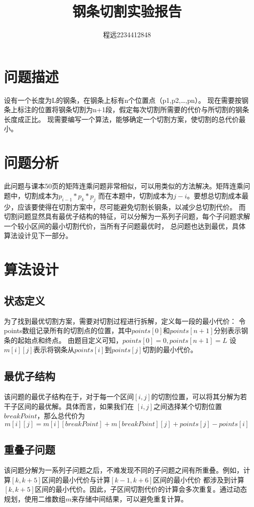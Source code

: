 \documentclass[UTF8]{ctexart}
\begin{document}
\title{\vspace{0cm}钢条切割实验报告}
\author{程远2234412848}
\date{}
\maketitle
\tableofcontents
\newpage

\section{问题描述}
设有一个长度为L的钢条，在钢条上标有n个位置点（p1,p2,…,pn）。
现在需要按钢条上标注的位置将钢条切割为n+1段，假定每次切割所需要的代价与所切割的钢条长度成正比。
现需要编写一个算法，能够确定一个切割方案，使切割的总代价最小。

\section{问题分析}
此问题与课本50页的矩阵连乘问题非常相似，可以用类似的方法解决。矩阵连乘问题中，切割成本为$p_{i-1} * p_k * p_j$
而在本题中，切割成本为$j - i$。要想总切割成本最少，应该要使得在切割方案中，尽可能避免切割长钢条，以减少总切割代价。
而切割问题显然具有最优子结构的特征，可以分解为一系列子问题，每个子问题求解一个较小区间的最小切割代价，当所有子问题最优时，
总问题也达到最优，具体算法设计见下一部分。

\section{算法设计}
\subsection{状态定义}
为了找到最优切割方案，需要对切割过程进行拆解，定义每一段的最小代价：
令points数组记录所有的切割点的位置，其中$points[0]$和$points[n+1]$分别表示钢条的起始点和终点。
由题目定义可知，$points[0] = 0, points[n+1] = L$
设$m[i][j]$表示将钢条从$points[i]$到$points[j]$切割的最小代价。

\subsection{最优子结构}
该问题的最优子结构在于，对于每一个区间$[i,j]$的切割位置，可以将其分解为若干子区间的最优解。具体而言，如果我们在 
$[i,j]$之间选择某个切割位置$breakPoint$，那么总代价为
\[
m[i][j] = m[i][breakPoint] + m[breakPoint][j] + points[j] - points[i]
\]

\subsection{重叠子问题}
该问题分解为一系列子问题之后，不难发现不同的子问题之间有所重叠。例如，计算$[k,k+5]$区间的最小代价与计算$[k-1,k+6]$区间的最小代价
都涉及到计算$[k,k+5]$区间的最小代价。因此，子区间切割代价的计算会多次重复。通过动态规划，使用二维数组$m$来存储中间结果，可以避免重复计算。
\end{document}
